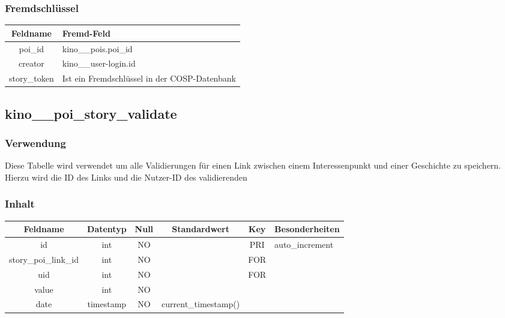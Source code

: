 \subsubsection{Fremdschlüssel}
\begin{table}[H]
	\begin{tabular}{|c|p{12.5cm}|}
		\hline
		\textbf{Feldname} & \textbf{Fremd-Feld} \\ \hline
		poi\_id & kino\_\_pois.poi\_id \\ \hline
		creator & kino\_\_user-login.id \\ \hline
		story\_token & Ist ein Fremdschlüssel in der {\glqq COSP\grqq}-Datenbank \\ \hline
	\end{tabular}
\end{table}
\subsection{kino\_\_poi\_story\_validate}
\subsubsection{Verwendung} Diese Tabelle wird verwendet um alle Validierungen für einen Link zwischen einem Interessenpunkt und einer Geschichte zu speichern. Hierzu wird die ID des Links und die Nutzer-ID des validierenden
\subsubsection{Inhalt}
\begin{table}[H]
	\begin{tabular}{|c|c|c|c|c|p{3.5cm}|}
		\hline
		\textbf{Feldname} & \textbf{Datentyp} & \textbf{Null} & \textbf{Standardwert} & \textbf{Key}   & \textbf{Besonderheiten} \\ \hline
		id & int & NO &  & PRI & auto\_increment \\ \hline
		story\_poi\_link\_id & int & NO &  & FOR & \\ \hline
		uid & int & NO &  & FOR & \\ \hline
		value & int & NO &  &  & \\ \hline
		date & timestamp & NO & current\_timestamp() &  & \\ \hline
	\end{tabular}
\end{table}
